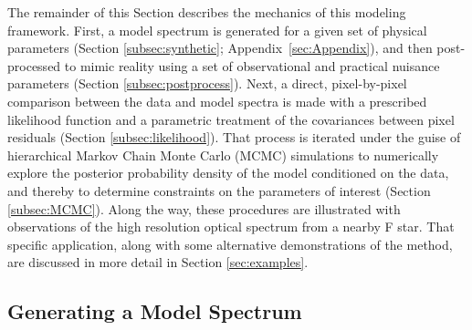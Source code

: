 \documentclass[iop,floatfix,numberedappendix,twocolappendix]{emulateapj}
\begin{document}
The remainder of this Section describes the mechanics of this modeling framework.  First, a model 
spectrum is generated for a given set of physical parameters (Section \ref{subsec:synthetic}; 
Appendix~\ref{sec:Appendix}), and then post-processed to mimic reality using a set of observational 
and practical nuisance parameters (Section \ref{subsec:postprocess}).  Next, a direct, 
pixel-by-pixel comparison between the data and model spectra is made with a prescribed likelihood 
function and a parametric treatment of the covariances between pixel residuals (Section 
\ref{subsec:likelihood}).  That process is iterated under the guise of hierarchical Markov Chain 
Monte Carlo (MCMC) simulations to numerically explore the posterior probability density of the 
model conditioned on the data, and thereby to determine constraints on the parameters of interest 
(Section \ref{subsec:MCMC}).  Along the way, these procedures are illustrated with observations of 
the high resolution optical spectrum from a nearby F star.  That specific application, along with 
some alternative demonstrations of the method, are discussed in more detail in Section 
\ref{sec:examples}.


\subsection{Generating a Model Spectrum \label{subsec:synthetic}}
\end{document}
